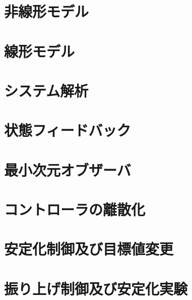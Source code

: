 \section{非線形モデル}
\section{線形モデル}
\section{システム解析}
\section{状態フィードバック}
\section{最小次元オブザーバ}
\section{コントローラの離散化}
\section{安定化制御及び目標値変更}
\section{振り上げ制御及び安定化実験}
